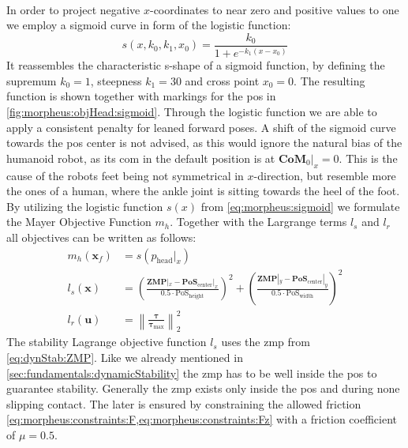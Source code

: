 \\
In order to project negative $x$-coordinates to near zero and positive values to one we employ a sigmoid curve in form of the logistic function:
\begin{equation}
  s(x,k_0,k_1,x_0) = \frac{k_0}{1+e^{-k_1(x-x_0)}}
  \label{eq:morpheus:sigmoid}
\end{equation}
It reassembles the characteristic s-shape of a sigmoid function, by defining the supremum $k_0 = 1$, steepness $k_1 = 30$ and cross point $x_0 = 0$.
The resulting function is shown together with markings for the \acrshort{pos} in \cref{fig:morpheus:objHead:sigmoid}.
Through the logistic function we are able to apply a consistent penalty for leaned forward poses.
A shift of the sigmoid curve towards the \acrshort{pos} center is not advised, as this would ignore the natural bias of the humanoid robot, as its \acrshort{com} in the default position is at $\textbf{CoM}_0|_x = 0$.
This is the cause of the robots feet being not symmetrical in $x$-direction, but resemble more the ones of a human, where the ankle joint is sitting towards the heel of the foot.
\\
By utilizing the logistic function $s(x)$ from \cref{eq:morpheus:sigmoid} we formulate the Mayer Objective Function $m_h$.
Together with the Largrange terms $l_s$ and $l_r$ all objectives can be written as follows:
\begin{subequations}
  \label{eq:morpheus:obj}
  \begin{align}
    m_h(\bm x_f) &= s(p_\text{head}|_x) \label{eq:morpheus:obj:head} \\
    l_s(\bm x) &= 
      \left(\frac{\textbf{ZMP}|_x - \textbf{PoS}_\text{center}|_x}{0.5\cdot\text{PoS}_\text{height}}\right)^2 
      + \left(\frac{\textbf{ZMP}|_y - \textbf{PoS}_\text{center}|_y}{0.5\cdot\text{PoS}_\text{width}}\right)^2
      \label{eq:morpheus:obj:stability} \\
    l_r(\bm u) &= \left\lVert \frac{\bm{\tau}}{\bm{\tau}_\text{max}} \right\rVert^2_2 \label{eq:morpheus:obj:regularization}
  \end{align}
\end{subequations}
The stability Lagrange objective function $l_s$ uses the \acrshort{zmp} from \cref{eq:dynStab:ZMP}.
Like we already mentioned in \cref{sec:fundamentals:dynamicStability} the \acrshort{zmp} has to be well inside the \acrshort{pos} to guarantee stability.
Generally the \acrshort{zmp} exists only inside the \acrshort{pos} and during none slipping contact.
The later is ensured by constraining the allowed friction \cref{eq:morpheus:constraints:F,eq:morpheus:constraints:Fz} with a friction coefficient of $\mu = 0.5$.
